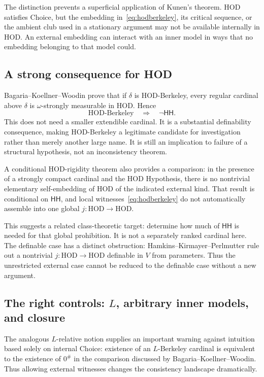 \documentclass[11pt,letterpaper]{article}
\theoremstyle{definition}
\newcommand{\HOD}{\mathrm{HOD}}
\newcommand{\HH}{\mathsf{HH}}
\begin{document}
The distinction prevents a superficial application of Kunen's theorem. HOD satisfies Choice, but the embedding in~\eqref{eq:hodberkeley}, its critical sequence, or the ambient club used in a stationary argument may not be available internally in HOD. An external embedding can interact with an inner model in ways that no embedding belonging to that model could.

\subsection{A strong consequence for HOD}

Bagaria--Koellner--Woodin prove that if $\delta$ is HOD-Berkeley, every regular cardinal above $\delta$ is $\omega$-strongly measurable in HOD. Hence
\[
 \text{HOD-Berkeley}\quad\Longrightarrow\quad\neg\HH.
\]
This does not need a smaller extendible cardinal. It is a substantial definability consequence, making HOD-Berkeley a legitimate candidate for investigation rather than merely another large name. It is still an implication to failure of a structural hypothesis, not an inconsistency theorem. \cite[Theorem~8.6]{bkw}

A conditional HOD-rigidity theorem also provides a comparison: in the presence of a strongly compact cardinal and the HOD Hypothesis, there is no nontrivial elementary self-embedding of HOD of the indicated external kind. That result is conditional on $\HH$, and local witnesses~\eqref{eq:hodberkeley} do not automatically assemble into one global $j:\HOD\to\HOD$. \cite{goldberghod}

This suggests a related class-theoretic target: determine how much of $\HH$ is needed for that global prohibition. It is not a separately ranked cardinal here. The definable case has a distinct obstruction: Hamkins--Kirmayer--Perlmutter rule out a nontrivial $j:\HOD\to\HOD$ definable in $V$ from parameters. Thus the unrestricted external case cannot be reduced to the definable case without a new argument. \cite{hkp}

\subsection{The right controls: $L$, arbitrary inner models, and closure}

The analogous $L$-relative notion supplies an important warning against intuition based solely on internal Choice: existence of an $L$-Berkeley cardinal is equivalent to the existence of $0^{\#}$ in the comparison discussed by Bagaria--Koellner--Woodin. Thus allowing external witnesses changes the consistency landscape dramatically. \cite{bkw}
\end{document}
